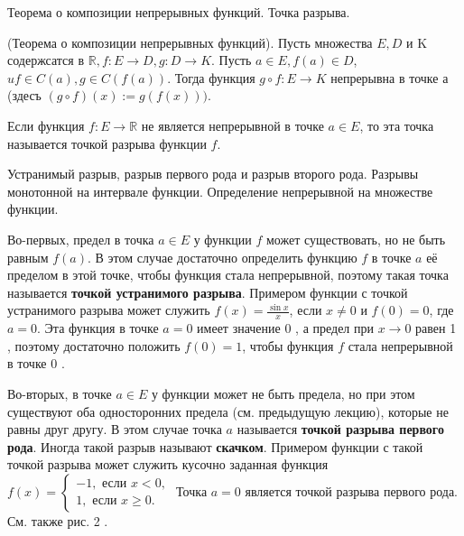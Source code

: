 \newpage
\begin{problem}
Теорема о композиции непрерывных функций. Точка разрыва.
\end{problem}
\begin{proposition}
    (Теорема о композиции непрерывных функций). Пусть множества $E, D$ и K содержсатся в $\mathbb{R}, f: E \rightarrow D, g: D \rightarrow K$. Пусть $a \in E, f(a) \in D$, $u f \in C(a), g \in C(f(a))$. Тогда функция $g \circ f: E \rightarrow K$ непрерывна в точке а (здесъ $(g \circ f)(x):=g(f(x)))$.
\end{proposition}

\begin{definition}
    Если функция $f: E \rightarrow \mathbb{R}$ не является непрерывной в точке $a \in E$, то эта точка называется точкой разрыва функции $f$.
\end{definition}

\newpage
\begin{problem}
Устранимый разрыв, разрыв первого рода и разрыв второго рода. Разрывы монотонной
на интервале функции. Определение непрерывной на множестве функции.
\end{problem}
Во-первых, предел в точка $a \in E$ у функции $f$ может существовать, но не быть равным $f(a)$. В этом случае достаточно определить функцию $f$ в точке $a$ её пределом в этой точке, чтобы функция стала непрерывной, поэтому такая точка называется \textbf{точкой устранимого разрыва}. Примером функции с точкой устранимого разрыва может служить $f(x)=\frac{\sin x}{x}$, если $x \neq 0$ и $f(0)=0$, где $a=0$. Эта функция в точке $a=0$ имеет значение 0 , а предел при $x \rightarrow 0$ равен 1 , поэтому достаточно положить $f(0)=1$, чтобы функция $f$ стала непрерывной в точке 0 .

Во-вторых, в точке $a \in E$ у функции может не быть предела, но при этом существуют оба односторонних предела (см. предыдущую лекцию), которые не равны друг другу. В этом случае точка $a$ называется \textbf{точкой разрыва первого рода}. Иногда такой разрыв называют \textbf{скачком}. Примером функции с такой точкой разрыва может служить кусочно заданная функция $f(x)=\left\{\begin{array}{l}-1, \text { если } x<0, \\ 1, \text { если } x \geq 0 .\end{array}\right.$ Точка $a=0$ является точкой разрыва первого рода. См. также рис. 2 .

